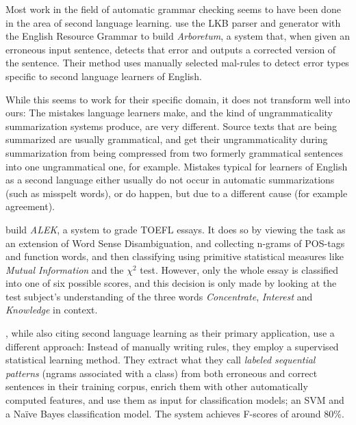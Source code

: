 \documentclass[a4paper,10pt]{scrartcl}
\theoremstyle{style}
\begin{document}

Most work in the field of automatic grammar checking seems to have been done in the area of second language learning.
\cite{bender2004arboretum} use the LKB parser and generator \cite{copestake2002implementing} with the English Resource Grammar \citep{flickinger2000building} to build \textit{Arboretum}, a system that, when given an erroneous input sentence, detects that error and outputs a corrected version of the sentence. Their method uses manually selected mal-rules \citep{schneider1998recognizing} to detect error types specific to second language learners of English.

While this seems to work for their specific domain, it does not transform well into ours: The mistakes language learners make, and the kind of ungrammaticality summarization systems produce, are very different. Source texts that are being summarized are usually grammatical, and get their ungrammaticality during summarization from being compressed from two formerly grammatical sentences into one ungrammatical one, for example. Mistakes typical for learners of English as a second language either usually do not occur in automatic summarizations (such as misspelt words), or do happen, but due to a different cause (for example agreement).

\cite{chodorow2000unsupervised} build \textit{ALEK}, a system to grade TOEFL essays. It does so by viewing the task as an extension of Word Sense Disambiguation, and collecting n-grams of POS-tags and function words, and then classifying using primitive statistical measures like \textit{Mutual Information} and the $\chi^2$ test. However, only the whole essay is classified into one of six possible scores, and this decision is only made by looking at the test subject's understanding of the three words \textit{Concentrate}, \textit{Interest} and \textit{Knowledge} in context.

\cite{sun2007detecting}, while also citing second language learning as their primary application, use a different approach: Instead of manually writing rules, they employ a supervised statistical learning method. They extract what they call \textit{labeled sequential patterns} (ngrams associated with a class) from both erroneous and correct sentences in their training corpus, enrich them with other automatically computed features, and use them as input for classification models; an SVM \citep[SVMlight,][]{Joachims/02a} and a Na\"ive Bayes classification model. The system achieves F-scores of around 80\%.
\end{document}
